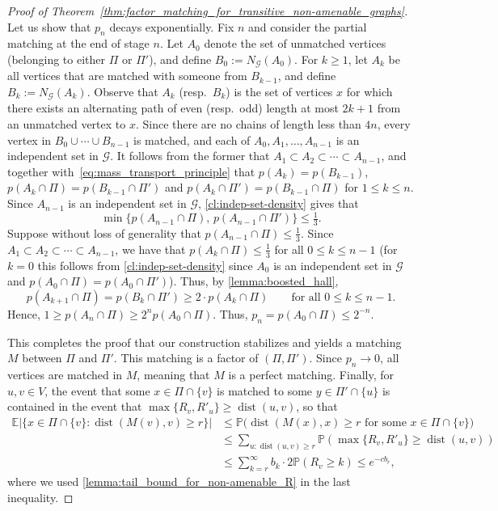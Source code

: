 \documentclass[11pt, reqno]{article}
\numberwithin{equation}{section}
\theoremstyle{definition}
\def\cG{\mathcal{G}}
\def\P{\mathbb{P}}
\def\E{\mathbb{E}}
\newcommand{\1}{\mathds{1}}
\DeclareMathOperator{\dist}{dist}
\begin{document}
\begin{proof}[Proof of Theorem~\ref{thm:factor_matching_for_transitive_non-amenable_graphs}]
    Let us show that $p_n$ decays exponentially.
    Fix $n$ and consider the partial matching at the end of stage $n$.
    Let $A_0$ denote the set of unmatched vertices (belonging to either $\Pi$ or $\Pi'$), and define $B_0 := N_\cG(A_0)$.
    For $k \ge 1$, let $A_k$ be all vertices that are matched with someone from $B_{k-1}$, and define $B_k := N_\cG(A_k)$.
    Observe that $A_k$ (resp.\ $B_k$) is the set of vertices $x$ for which there exists an alternating path of even (resp.\ odd) length at most $2k+1$ from an unmatched vertex to $x$.
    Since there are no chains of length less than $4n$, every vertex in $B_0 \cup \cdots \cup B_{n-1}$ is matched, and each of $A_0,A_1,\dots,A_{n-1}$ is an independent set in $\cG$.
    It follows from the former that $A_1 \subset A_2 \subset \cdots \subset A_{n-1}$, and together with~\eqref{eq:mass_transport_principle} that $p(A_k)=p(B_{k-1})$, $p(A_k \cap \Pi)=p(B_{k-1} \cap \Pi')$ and $p(A_k \cap \Pi')=p(B_{k-1} \cap \Pi)$ for $1 \le k \le n$.
    Since $A_{n-1}$ is an independent set in $\cG$, \cref{cl:indep-set-density} gives that
    \[ \min\big\{p(A_{n-1} \cap \Pi),\, p(A_{n-1} \cap \Pi')\big\} \le \tfrac13 .\]
    Suppose without loss of generality that $p(A_{n-1} \cap \Pi) \le \frac13$.
    Since $A_1 \subset A_2 \subset \cdots \subset A_{n-1}$, we have that $p(A_k \cap \Pi) \le \frac13$ for all $0 \le k \le n-1$ (for $k=0$ this follows from \cref{cl:indep-set-density} since $A_0$ is an independent set in $\cG$ and $p(A_0 \cap \Pi)=p(A_0 \cap \Pi')$).
    Thus, by \cref{lemma:boosted_hall},
    \[ p(A_{k+1} \cap \Pi) = p(B_k \cap \Pi') \ge 2 \cdot p(A_k \cap \Pi) \qquad\text{for all }0 \le k \le n-1 .\]
    Hence, $1 \ge p(A_n \cap \Pi) \ge 2^n p(A_0 \cap \Pi)$. Thus, $p_n=p(A_0 \cap \Pi) \le 2^{-n}$.

    \noindent
    This completes the proof that our construction stabilizes and yields a matching $M$ between $\Pi$ and $\Pi'$.
    This matching is a factor of $(\Pi,\Pi')$.
    Since $p_n \to 0$, all vertices are matched in $M$, meaning that $M$ is a perfect matching.
    Finally, for $u,v \in V$, the event that some $x \in \Pi \cap \{v\}$ is matched to some $y \in \Pi' \cap \{u\}$ is contained in the event that $\max\{R_v,R'_u\} \ge \dist(u,v)$, so that
    \begin{align*}
     \E |\{ x \in \Pi \cap \{v\} : \dist(M(v),v) \ge r\}|
      &\le \P\big(\dist(M(x),x) \ge r\text{ for some }x \in \Pi \cap \{v\}\big) \\
      &\le \sum_{u:\dist(u,v) \ge r} \P(\max\{R_v,R'_u\} \ge \dist(u,v)) \\
      &\le \sum_{k=r}^\infty b_k \cdot 2\P(R_v \ge k) \le e^{-c b_r} ,
    \end{align*}
    where we used \cref{lemma:tail_bound_for_non-amenable_R} in the last inequality.
\end{proof}
\end{document}
